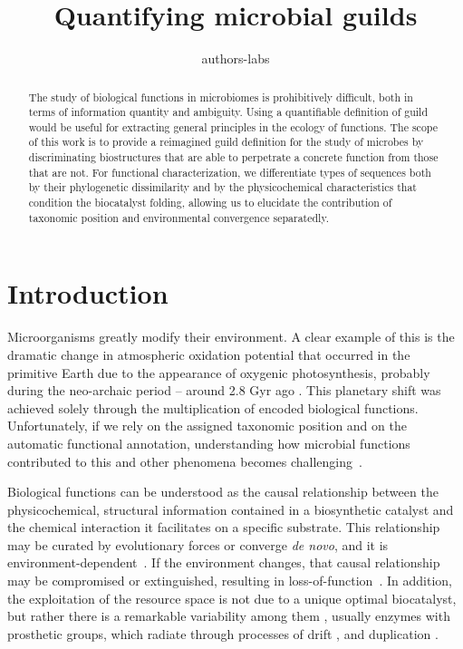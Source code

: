 \documentclass[Journal,letterpaper,NoLists]{ascelike-new}
\begin{document}
\title{Quantifying microbial guilds}
\author[Authors]{authors-labs}
\maketitle




\begin{abstract}
The study of biological functions in microbiomes is prohibitively difficult, both in terms of information quantity and ambiguity. Using a quantifiable definition of guild would be useful for extracting general principles in the ecology of functions. The scope of this work is to provide a reimagined guild definition for the study of microbes by discriminating biostructures that are able to perpetrate a concrete function from those that are not. For functional characterization, we differentiate types of sequences both by their phylogenetic dissimilarity and by the physicochemical characteristics that condition the biocatalyst folding, allowing us to elucidate the contribution of taxonomic position and environmental convergence separatedly. 


\end{abstract}
\newpage


\section{Introduction}


Microorganisms greatly modify their environment. A clear example of this is the dramatic change in atmospheric oxidation potential that occurred in the primitive Earth due to the appearance of oxygenic photosynthesis, probably during the neo-archaic period – around 2.8 Gyr ago \cite{cavalier_2006}. This planetary shift was achieved solely through the multiplication of encoded biological functions. Unfortunately, if we rely on the assigned taxonomic position and on the automatic functional annotation, understanding how microbial functions contributed to this and other phenomena becomes challenging~\cite{tikhonov2017theoretical,koskella2017microbiome}.

Biological functions can be understood as the causal relationship between the physicochemical, structural information contained in a biosynthetic catalyst and the chemical interaction it facilitates on a specific substrate. This relationship may be curated by evolutionary forces or converge \textit{de novo}, and it is environment-dependent~\cite{huynen2000predicting}. If the environment changes, that causal relationship may be compromised or extinguished, resulting in loss-of-function~\cite{forbes2019loss}. In addition, the exploitation of the resource space is not due to a unique optimal biocatalyst, but rather there is a remarkable variability among them \cite{dourado2021optimality}, usually enzymes with prosthetic groups, which radiate through processes of drift \cite{masel2011genetic,lynch2016genetic}, and duplication \cite{altenhoff2012inferring}. 
\end{document}
